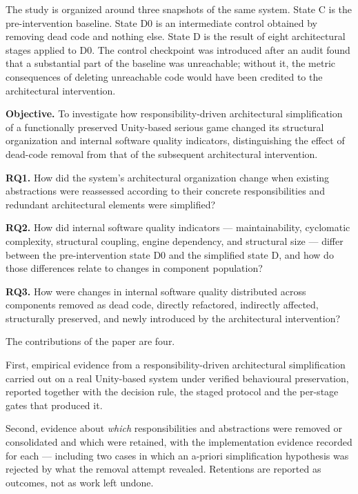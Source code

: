 \documentclass{sbc2019}%
\begin{document}
The study is organized around three snapshots of the same system. State C is
the pre-intervention baseline. State D0 is an intermediate control obtained by
removing dead code and nothing else. State D is the result of eight
architectural stages applied to D0. The control checkpoint was introduced after
an audit found that a substantial part of the baseline was unreachable; without
it, the metric consequences of deleting unreachable code would have been
credited to the architectural intervention.

\medskip\noindent\textbf{Objective.} To investigate how responsibility-driven
architectural simplification of a functionally preserved Unity-based serious
game changed its structural organization and internal software quality
indicators, distinguishing the effect of dead-code removal from that of the
subsequent architectural intervention.

\medskip\noindent\textbf{RQ1.} How did the system's architectural organization
change when existing abstractions were reassessed according to their concrete
responsibilities and redundant architectural elements were simplified?

\medskip\noindent\textbf{RQ2.} How did internal software quality indicators ---
maintainability, cyclomatic complexity, structural coupling, engine dependency,
and structural size --- differ between the pre-intervention state D0 and the
simplified state D, and how do those differences relate to changes in component
population?

\medskip\noindent\textbf{RQ3.} How were changes in internal software quality
distributed across components removed as dead code, directly refactored,
indirectly affected, structurally preserved, and newly introduced by the
architectural intervention?

\medskip

The contributions of the paper are four.

First, empirical evidence from a responsibility-driven architectural
simplification carried out on a real Unity-based system under verified
behavioural preservation, reported together with the decision rule, the staged
protocol and the per-stage gates that produced it.

Second, evidence about \emph{which} responsibilities and abstractions were removed
or consolidated and which were retained, with the implementation evidence
recorded for each --- including two cases in which an a-priori simplification
hypothesis was rejected by what the removal attempt revealed. Retentions are
reported as outcomes, not as work left undone.
\end{document}
